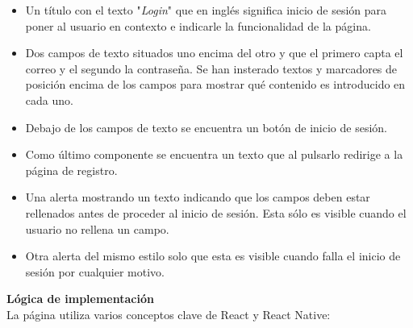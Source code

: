 \documentclass[twoside, openright, 11pt]{report}
\begin{document}
				\begin{itemize}
					\item Un título con el texto "\textit{Login}" que en inglés significa inicio de sesión para poner al usuario en contexto e indicarle la funcionalidad de la página.
					\item Dos campos de texto situados uno encima del otro y que el primero capta el correo y el segundo la contraseña. Se han insterado textos y marcadores de posición encima de los campos para mostrar qué contenido es introducido en cada uno.
					\item Debajo de los campos de texto se encuentra un botón de inicio de sesión.
					\item Como último componente se encuentra un texto que al pulsarlo redirige a la página de registro.
					\item Una alerta mostrando un texto indicando que los campos deben estar rellenados antes de proceder al inicio de sesión. Esta sólo es visible cuando el usuario no rellena un campo.
					\item Otra alerta del mismo estilo solo que esta es visible cuando falla el inicio de sesión por cualquier motivo.
				\end{itemize}
			
			
				\textbf{Lógica de implementación}\\
				La página utiliza varios conceptos clave de React y React Native:
				
\end{document}
